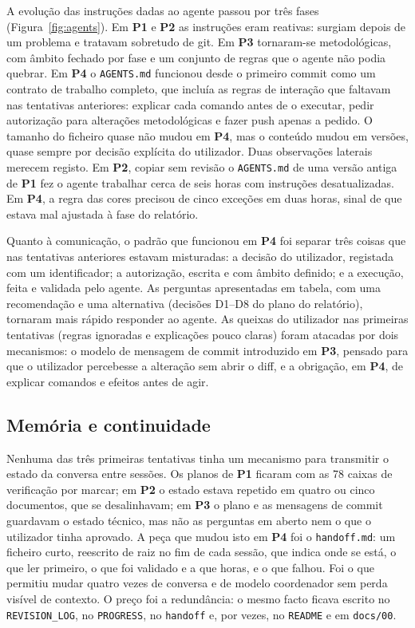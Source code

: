 \documentclass[11pt,a4paper]{article}
\newcommand{\Pum}{\textbf{P1}}
\newcommand{\Pdois}{\textbf{P2}}
\newcommand{\Ptres}{\textbf{P3}}
\newcommand{\Pquatro}{\textbf{P4}}
\begin{document}
A evolução das instruções dadas ao agente passou por três fases (Figura~\ref{fig:agents}). Em
\Pum{} e \Pdois{} as instruções eram reativas: surgiam depois de um problema e tratavam sobretudo
de git. Em \Ptres{} tornaram-se metodológicas, com âmbito fechado por fase e um conjunto de
regras que o agente não podia quebrar. Em \Pquatro{} o \texttt{AGENTS.md} funcionou desde o
primeiro commit como um contrato de trabalho completo, que incluía as regras de interação que
faltavam nas tentativas anteriores: explicar cada comando antes de o executar, pedir autorização
para alterações metodológicas e fazer push apenas a pedido. O tamanho do ficheiro quase não mudou
em \Pquatro, mas o conteúdo mudou em \mQuatroAgentsVersoes{} versões, quase sempre por decisão
explícita do utilizador. Duas observações laterais merecem registo. Em \Pdois, copiar sem revisão
o \texttt{AGENTS.md} de uma versão antiga de \Pum{} fez o agente trabalhar cerca de seis horas com
instruções desatualizadas. Em \Pquatro, a regra das cores precisou de cinco exceções em duas
horas, sinal de que estava mal ajustada à fase do relatório.

Quanto à comunicação, o padrão que funcionou em \Pquatro{} foi separar três coisas que nas
tentativas anteriores estavam misturadas: a decisão do utilizador, registada com um
identificador; a autorização, escrita e com âmbito definido; e a execução, feita e validada pelo
agente. As perguntas apresentadas em tabela, com uma recomendação e uma alternativa (decisões
D1--D8 do plano do relatório), tornaram mais rápido responder ao agente. As queixas do utilizador
nas primeiras tentativas (regras ignoradas e explicações pouco claras) foram atacadas por dois
mecanismos: o modelo de mensagem de commit introduzido em \Ptres, pensado para que o utilizador
percebesse a alteração sem abrir o diff, e a obrigação, em \Pquatro, de explicar comandos e
efeitos antes de agir.

\subsection{Memória e continuidade}

Nenhuma das três primeiras tentativas tinha um mecanismo para transmitir o estado da conversa
entre sessões. Os planos de \Pum{} ficaram com as 78 caixas de verificação por marcar; em
\Pdois{} o estado estava repetido em quatro ou cinco documentos, que se desalinhavam; em \Ptres{}
o plano e as mensagens de commit guardavam o estado técnico, mas não as perguntas em aberto nem o
que o utilizador tinha aprovado. A peça que mudou isto em \Pquatro{} foi o \texttt{handoff.md}: um
ficheiro curto, reescrito de raiz no fim de cada sessão, que indica onde se está, o que ler
primeiro, o que foi validado e a que horas, e o que falhou. Foi o que permitiu mudar quatro vezes
de conversa e de modelo coordenador sem perda visível de contexto. O preço foi a redundância: o
mesmo facto ficava escrito no \texttt{REVISION\_LOG}, no \texttt{PROGRESS}, no \texttt{handoff}
e, por vezes, no \texttt{README} e em \texttt{docs/00}.
\end{document}
